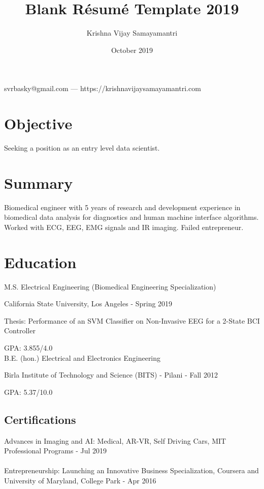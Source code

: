\documentclass{article}
\makeatletter
\renewcommand{\maketitle}{
\begin{center}
    {\huge\bfseries
    \theauthor}
    
    \vspace{.25em}
    
    svrbasky@gmail.com --- https://krishnavijaysamayamantri.com
    
\end{center}
}
\makeatother
\begin{document}
\title{Blank R\'esum\'e Template 2019}
\author{Krishna Vijay Samayamantri}
\date{October 2019}
\maketitle


\section{Objective}
Seeking a position as an entry level data scientist.

\section{Summary}
Biomedical engineer with 5 years of research and development experience in biomedical data analysis for diagnostics and human machine interface algorithms. Worked with ECG, EEG, EMG signals and IR imaging. Failed entrepreneur.

\section{Education}
M.S. Electrical Engineering (Biomedical Engineering Specialization)

\noindent    
California State University, Los Angeles - Spring 2019

\noindent    
Thesis: Performance of an SVM Classifier on Non-Invasive EEG for a 2-State BCI Controller 

\noindent   
GPA: 3.855/4.0\\

\noindent    
B.E. (hon.) Electrical and Electronics Engineering

\noindent    
Birla Institute of Technology and Science (BITS) - Pilani - Fall 2012

\noindent    
GPA: 5.37/10.0


\subsection{Certifications}
Advances in Imaging and AI: Medical, AR-VR, Self Driving Cars, MIT Professional Programs - Jul 2019\\
\\
Entrepreneurship: Launching an Innovative Business Specialization, Coursera and University of Maryland, College Park - Apr 2016
\end{document}
